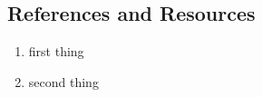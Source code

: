 \subsection{References and Resources}
\begin{enumerate}
  \setlength\itemsep{0.00em}
  \item first thing
  \item second thing
\end{enumerate}
